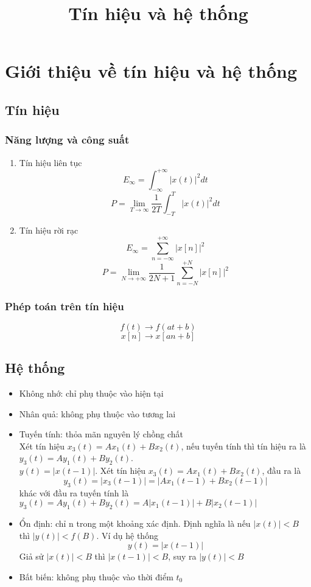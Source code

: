 \documentclass{article}
\title{Tín hiệu và hệ thống}
\begin{document}
\maketitle
\section{Giới thiệu về tín hiệu và hệ thống}
\subsection{Tín hiệu}
\subsubsection{Năng lượng và công suất}
\begin{enumerate}
    \item Tín hiệu liên tục
    $$E_{\infty}=\int_{-\infty}^{+\infty}|x(t)|^2dt$$
    $$P=\lim_{T\to\infty}\frac{1}{2T}\int_{-T}^{T}|x(t)|^2dt$$
    \item Tín hiệu rời rạc
    $$E_{\infty}=\sum_{n=-\infty}^{+\infty}|x[n]|^2$$
    $$P=\lim_{N\to+\infty}\frac{1}{2N+1}\sum_{n=-N}^{+N}|x[n]|^2$$
\end{enumerate}
\subsubsection{Phép toán trên tín hiệu}
$$f(t)\to f(at+b)$$
$$x[n]\to x[an+b]$$
\subsection{Hệ thống}
\begin{itemize}
    \item Không nhớ: chỉ phụ thuộc vào hiện tại
    \item Nhân quả: không phụ thuộc vào tương lai
    \item Tuyến tính: thỏa mãn nguyên lý chồng chất
\\ Xét tín hiệu $x_{3}(t)=Ax_{1}(t)+Bx_{2}(t)$, nếu tuyến tính thì tín hiệu ra là $y_{3}(t)=Ay_{1}(t)+By_{2}(t)$.
\\ $y(t)=|x(t-1)|$. Xét tín hiệu $x_{3}(t)=Ax_{1}(t)+Bx_{2}(t)$, đầu ra là $$y_{3}(t)=|x_{3}(t-1)|=|Ax_{1}(t-1)+Bx_{2}(t-1)|$$
khác với đầu ra tuyến tính là $y_{3}(t)=Ay_{1}(t)+By_{2}(t)=A|x_{1}(t-1)|+B|x_{2}(t-1)|$




    \item Ổn định: chỉ n trong một khoảng xác định. Định nghĩa là nếu $|x(t)|<B$ thì $|y(t)|<f(B)$. Ví dụ hệ thống
    $$y(t)=|x(t-1)|$$
    Giả sử $|x(t)|<B$ thì $|x(t-1)|<B$, suy ra $|y(t)|<B$
    \item Bất biến: không phụ thuộc vào thời điểm $t_{0}$
\end{itemize}
\end{document}
